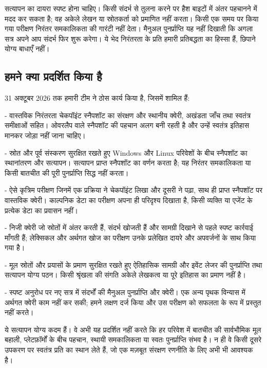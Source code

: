 \documentclass[11pt]{article}
\begin{document}
सत्यापन का दायरा स्पष्ट होना चाहिए। किसी संदर्भ से तुलना करने पर हैश बाइटों में अंतर पहचानने में मदद कर सकता है; वह अकेले लेखन या स्रोतकर्ता को प्रमाणित नहीं करता। किसी एक समय पर किया गया परीक्षण निरंतर समकालिकता की गारंटी नहीं देता। मैनुअल पुनर्प्राप्ति यह नहीं दिखाती कि अगला सत्र अपने आप संदर्भ फिर शुरू करेगा। ये भेद निरंतरता के प्रति हमारी प्रतिबद्धता का हिस्सा हैं, छिपाने योग्य बाधाएँ नहीं।

\subsection*{हमने क्या प्रदर्शित किया है}

31 अक्टूबर 2026 तक हमारी टीम ने ठोस कार्य किया है, जिसमें शामिल हैं:

- वास्तविक निरंतरता चेकपॉइंट स्नैपशॉट का संरक्षण और स्थानीय क्वेरी, अखंडता जाँच तथा स्वतंत्र समीक्षाओं सहित। ओवरलैप वाले स्नैपशॉट की पहचान अलग बनी रहती है और उन्हें स्वतंत्र इतिहास मानकर जोड़ा नहीं जाना चाहिए।

- स्रोत और पूर्व संस्करण सुरक्षित रखते हुए Windows और Linux परिवेशों के बीच स्नैपशॉट का स्थानांतरण और सत्यापन। सत्यापन प्राप्त स्नैपशॉट का वर्णन करता है; यह निरंतर समकालिकता या किसी बातचीत की पूरी पुनर्प्राप्ति सिद्ध नहीं करता।

- ऐसे कृत्रिम परीक्षण जिनमें एक प्रक्रिया ने चेकपॉइंट लिखा और दूसरी ने पढ़ा, साथ ही प्राप्त स्नैपशॉट पर वास्तविक क्वेरी। काल्पनिक डेटा का परीक्षण अपना ही परिदृश्य दिखाता है, किसी व्यक्ति या एजेंट के प्रत्येक डेटा का प्रवासन नहीं।

- निजी क्वेरी जो स्रोतों में अंतर करती हैं, संदर्भ खोजती हैं और सामग्री दिखाने से पहले स्पष्ट कार्रवाई माँगती हैं; लेक्सिकल और अर्थगत खोज का परीक्षण उनके प्रलेखित दायरे और अपवर्जनों के साथ किया गया है।

- मूल स्रोतों और प्रयासों के प्रमाण सुरक्षित रखते हुए ऐतिहासिक सामग्री और इवेंट लेजर की पुनर्प्राप्ति तथा सत्यापन योग्य पठन। किसी श्रृंखला की संगति अकेले लेखकत्व या पूरे इतिहास का प्रमाण नहीं है।

- स्पष्ट अनुरोध पर नए सत्र में संदर्भों की मैनुअल पुनर्प्राप्ति और क्वेरी। एक अन्य पृथक विन्यास में अर्थगत क्वेरी काम नहीं कर सकी; हमने लक्षण दर्ज किया और उस परीक्षण को सफलता के रूप में प्रस्तुत नहीं करते।

ये सत्यापन योग्य कदम हैं। वे अभी यह प्रदर्शित नहीं करते कि हर परिवेश में बातचीत की सार्वभौमिक मूल बहाली, प्लेटफ़ॉर्मों के बीच पहचान, स्थायी समकालिकता या स्वतः पुनर्प्राप्ति संभव है। न ही वे किसी दूसरे उपकरण पर स्वतंत्र प्रति का स्थान लेते हैं, जो एक मज़बूत संरक्षण रणनीति के लिए अभी भी आवश्यक है।
\end{document}
